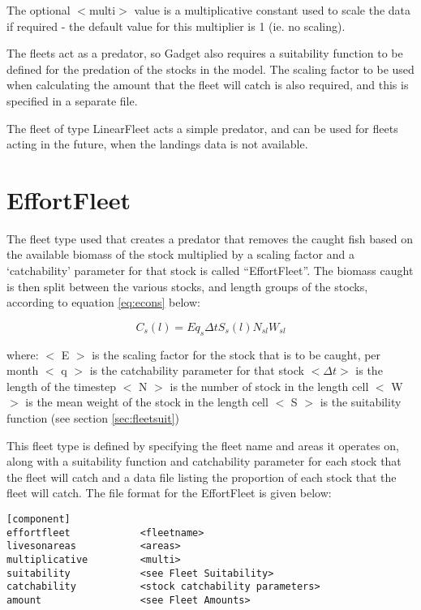 \documentclass[]{book}
\begin{document}
The optional \(<\)multi\(>\) value is a multiplicative constant used to
scale the data if required - the default value for this multiplier is 1
(ie. no scaling).

The fleets act as a predator, so Gadget also requires a suitability
function to be defined for the predation of the stocks in the model. The
scaling factor to be used when calculating the amount that the fleet
will catch is also required, and this is specified in a separate file.

The fleet of type LinearFleet acts a simple predator, and can be used
for fleets acting in the future, when the landings data is not
available.

\hypertarget{sec:effortfleet}{%
\section{EffortFleet}\label{sec:effortfleet}}

The fleet type used that creates a predator that removes the caught fish
based on the available biomass of the stock multiplied by a scaling
factor and a `catchability' parameter for that stock is called
``EffortFleet''. The biomass caught is then split between the various
stocks, and length groups of the stocks, according to
equation \eqref{eq:econs} below:

\begin{equation}
\label{eq:econs}
C_{s}(l) = E q_{s} \Delta t S_{s}(l) N_{sl} W_{sl}\end{equation}

where: \(<\) E \(>\) is the scaling factor for the stock that is to be
caught, per month \(<\) q \(>\) is the catchability parameter for that stock
\(<\Delta t>\) is the length of the timestep \(<\) N \(>\) is the number of
stock in the length cell \(<\) W \(>\) is the mean weight of the stock in
the length cell \(<\) S \(>\) is the suitability function (see
section \ref{sec:fleetsuit})

This fleet type is defined by specifying the fleet name and areas it
operates on, along with a suitability function and catchability
parameter for each stock that the fleet will catch and a data file
listing the proportion of each stock that the fleet will catch. The file
format for the EffortFleet is given below:

\begin{verbatim}
[component]
effortfleet            <fleetname>
livesonareas           <areas>
multiplicative         <multi>
suitability            <see Fleet Suitability>
catchability           <stock catchability parameters>
amount                 <see Fleet Amounts>
\end{verbatim}
\end{document}
